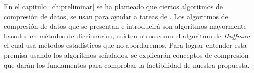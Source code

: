 En el capitulo~\ref{ch:preliminar} se ha planteado que ciertos algoritmos de compresión de datos, se usan para ayudar a tareas de \machinelearning. Los algoritmos de compresión de datos que se presentan e introducirá son algoritmos mayormente basados en métodos de diccionarios, existen otros como el algoritmo de \emph{Huffman} el cual usa métodos estadísticos que no abordaremos. Para lograr entender esta premisa usando los algoritmos señalados, se explicarán conceptos de compresión que darán los fundamentos para comprobar la factibilidad de nuestra propuesta. 


